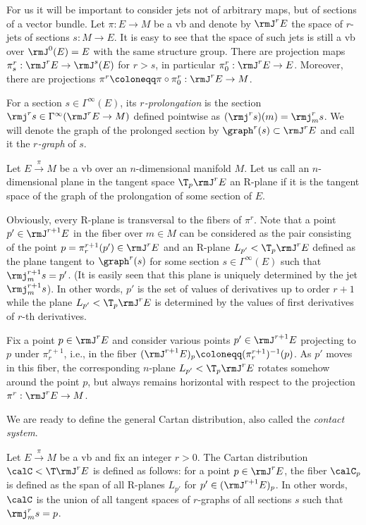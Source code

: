 For us it will be important to consider jets not of arbitrary maps, but of sections of a vector bundle. Let $\pi:E\to M$ be a \gls{vb} and denote by $\rmJ^rE$ the space of $r$-jets of sections $s:M\to E$. It is easy to see that the space of such jets is still a \gls{vb} over $\rmJ^0(E)=E$ with the same structure group. There are projection maps $\pi^r_s:\rmJ^rE\to \rmJ^s(E)$ for $r>s$, in particular $\pi^r_0:\rmJ^rE\to E$. Moreover, there are projections $\pi^r\coloneqq \pi\circ \pi^r_0:\rmJ^rE\to M$.

For a section $s\in \Gamma^\infty(E)$, its \emph{$r$-prolongation} is the section $\rmj^r s\in \Gamma^\infty(\rmJ^rE\to M)$ defined pointwise as $(\rmj^r s)(m)=\rmj_m^r s$. We will denote the graph of the prolonged section by $\graph^r(s)\subset \rmJ^rE$ and call it the \emph{$r$-graph} of $s$.

\begin{defn}[R-plane]
    Let $E\overset{\pi}{\to}M$ be a \gls{vb} over an $n$-dimensional manifold $M$. Let us call an $n$-dimensional plane in the tangent space $\T_p \rmJ^rE$ an R-plane if it is the tangent space of the graph of the prolongation of some section of $E$.
\end{defn}

Obviously, every R-plane is transversal to the fibers of $\pi^r$. Note that a point $p'\in \rmJ^{r+1}E$ in the fiber over $m\in M$ can be considered as the pair consisting of the point $p=\pi^{r+1}_r(p')\in \rmJ^rE$ and an R-plane $L_{p'}<\T_p \rmJ^rE$ defined as the plane tangent to $\graph^r(s)$ for some section $s\in\Gamma^\infty(E)$ such that $\rmj^{r+1}_m s=p'$. (It is easily seen that this plane is uniquely determined by the jet $\rmj^{r+1}_m s$). In other words, $p'$ is the set of values of derivatives up to order $r+1$ while the plane $L_{p'}<\T_p \rmJ^rE$ is determined by the values of first derivatives of $r$-th derivatives.

Fix a point $p\in \rmJ^rE$ and consider various points $p'\in \rmJ^{r+1}E$ projecting to $p$ under $\pi^{r+1}_r$, i.e., in the fiber $(\rmJ^{r+1}E)_p\coloneqq (\pi^{r+1}_r)^{-1}(p)$. As $p'$ moves in this fiber, the corresponding $n$-plane $L_{p'}<\T_p\rmJ^rE$ rotates somehow around the point $p$, but always remains horizontal with respect to the projection $\pi^r:\rmJ^rE\to M$.

We are ready to define the general Cartan distribution, also called the \emph{contact system}.

\begin{defn}
    Let $E\overset{\pi}{\to} M$ be a \gls{vb} and fix an integer $r>0$. The Cartan distribution $\calC<\T \rmJ^rE$ is defined as follows: for a point $p\in \rmJ^rE$, the fiber $\calC_p$ is defined as the span of all R-planes $L_{p'}$ for $p'\in (\rmJ^{r+1}E)_p$. In other words, $\calC$ is the union of all tangent spaces of $r$-graphs of all sections $s$ such that $\rmj^r_m s=p$.
\end{defn}

